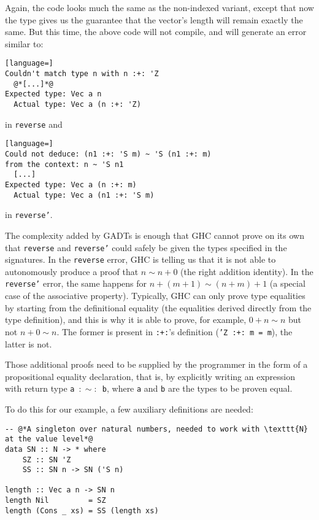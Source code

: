 Again, the code looks much the same as the non-indexed variant, except that now the type gives us the guarantee that the vector's length will remain exactly the same.
But this time, the above code will not compile, and will generate an error similar to:

\begin{lstlisting}[language=]
Couldn't match type n with n :+: 'Z
  @*[...]*@
Expected type: Vec a n
  Actual type: Vec a (n :+: 'Z)
\end{lstlisting}

in \texttt{reverse} and

\begin{lstlisting}[language=]
Could not deduce: (n1 :+: 'S m) ~ 'S (n1 :+: m)
from the context: n ~ 'S n1
  [...]
Expected type: Vec a (n :+: m)
  Actual type: Vec a (n1 :+: 'S m)
\end{lstlisting}

in \texttt{reverse'}.

The complexity added by GADTs is enough that GHC cannot prove on its own that \texttt{reverse} and \texttt{reverse'} could safely be given the types specified in the signatures.
In the \texttt{reverse} error, GHC is telling us that it is not able to autonomously produce a proof that $n \sim n+0$ (the right addition identity).
In the \texttt{reverse'} error, the same happens for $n+(m+1) \sim (n+m)+1$ (a special case of the associative property).
Typically, GHC can only prove type equalities by starting from the definitional equality (the equalities derived directly from the type definition), and this is why it is able to prove, for example, $0+n \sim n$ but not $n+0 \sim n$. The former is present in \texttt{:+:}'s definition (\texttt{'Z :+: m = m}), the latter is not.

Those additional proofs need to be supplied by the programmer in the form of a propositional equality declaration, that is, by explicitly writing an expression with return type \texttt{a $:\sim:$ b}, where \texttt{a} and \texttt{b} are the types to be proven equal.

To do this for our example, a few auxiliary definitions are needed:

\begin{lstlisting}[caption=Bringing \texttt{N} to the value level]
-- @*A singleton over natural numbers, needed to work with \texttt{N} at the value level*@
data SN :: N -> * where
    SZ :: SN 'Z
    SS :: SN n -> SN ('S n)

length :: Vec a n -> SN n
length Nil         = SZ
length (Cons _ xs) = SS (length xs)
\end{lstlisting}

